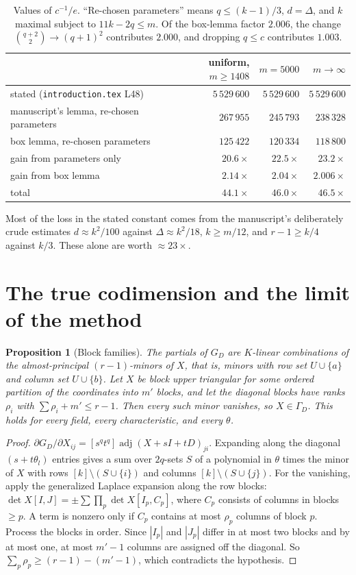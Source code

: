 \documentclass[11pt]{amsart}
\newtheorem{proposition}[theorem]{Proposition}
\theoremstyle{remark}
\DeclareMathOperator{\adj}{adj}
\begin{document}
\begin{table}[h]
\begin{tabular}{lrrr}
\toprule
 & uniform, $m\ge1408$ & $m=5000$ & $m\to\infty$\\
\midrule
stated (\texttt{introduction.tex} L48) & $5\,529\,600$ & $5\,529\,600$ & $5\,529\,600$\\
manuscript's lemma, re-chosen parameters & $267\,955$ & $245\,793$ & $238\,328$\\
box lemma, re-chosen parameters & $125\,422$ & $120\,334$ & $118\,800$\\
\midrule
gain from parameters only & $20.6\times$ & $22.5\times$ & $23.2\times$\\
gain from box lemma & $2.14\times$ & $2.04\times$ & $2.006\times$\\
total & $44.1\times$ & $46.0\times$ & $46.5\times$\\
\bottomrule
\end{tabular}
\caption{Values of $c^{-1}/e$. ``Re-chosen parameters'' means $q\le(k-1)/3$,
$d=\Delta$, and $k$ maximal subject to $11k-2q\le m$. Of the box-lemma factor
$2.006$, the change $\binom{q+2}2\to(q+1)^2$ contributes $2.000$, and dropping
$q\le c$ contributes $1.003$.}
\end{table}

Most of the loss in the stated constant comes from the manuscript's
deliberately crude estimates $d\approx k^2/100$ against $\Delta\approx k^2/18$,
$k\ge m/12$, and $r-1\ge k/4$ against $k/3$. These alone are worth
$\approx23\times$.

\section{The true codimension and the limit of the method}
\begin{proposition}[Block families]\label{prop:F}
The partials of $G_D$ are $K$-linear combinations of the
\emph{almost-principal} $(r-1)$-minors of $X$, that is, minors with row set
$U\cup\{a\}$ and column set $U\cup\{b\}$. Let $X$ be block upper triangular
for some ordered partition of the coordinates into $m'$ blocks, and let the
diagonal blocks have ranks $\rho_i$ with $\sum\rho_i+m'\le r-1$. Then every
such minor vanishes, so $X\in\Gamma_D$. This holds for every field, every
characteristic, and every $\theta$.
\end{proposition}

\begin{proof}
$\partial G_D/\partial X_{ij}=[s^qt^q]\adj(X+sI+tD)_{ji}$. Expanding along the
diagonal $(s+t\theta_l)$ entries gives a sum over $2q$-sets $S$ of a polynomial
in $\theta$ times the minor of $X$ with rows $[k]\setminus(S\cup\{i\})$ and
columns $[k]\setminus(S\cup\{j\})$. For the vanishing, apply the generalized
Laplace expansion along the row blocks:
$\det X[I,J]=\pm\sum\prod_p\det X[I_p,C_p]$, where $C_p$ consists of columns in
blocks $\ge p$. A term is nonzero only if $C_p$ contains at most $\rho_p$
columns of block $p$. Process the blocks in order. Since $|I_p|$ and $|J_p|$
differ in at most two blocks and by at most one, at most $m'-1$ columns are
assigned off the diagonal. So $\sum_p\rho_p\ge (r-1)-(m'-1)$, which
contradicts the hypothesis.
\end{proof}
\end{document}
